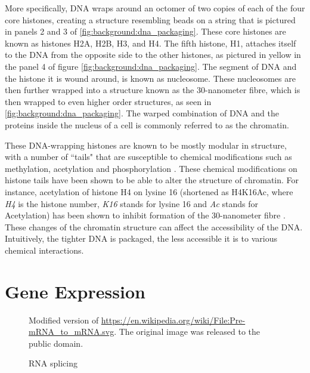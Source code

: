\documentclass[parskip]{cs4rep}
\newcommand{\histonemodification}[1]{#1}
\begin{document}
More specifically, DNA wraps around an octomer of two copies of each of the four core histones, creating a structure resembling beads on a string that is pictured in panels 2 and 3 of \autoref{fig:background:dna_packaging}. These core histones are known as histones H2A, H2B, H3, and H4.
The fifth histone, H1, attaches itself to the DNA from the opposite side to the other histones, as pictured in yellow in the panel 4 of figure \ref{fig:background:dna_packaging}. The segment of DNA and the histone it is wound around, is known as nucleosome. These nucleosomes are then further wrapped into a structure known as the 30-nanometer fibre, which is then  wrapped to even higher order structures, as seen in \autoref{fig:background:dna_packaging}. The warped combination of DNA and the proteins inside the nucleus of a cell is commonly referred to as the chromatin.

These DNA-wrapping histones are known to be mostly modular in structure, with a number of ``tails" that are susceptible to chemical modifications such as methylation, acetylation and phosphorylation \cite{Fischle:2003tl,Kouzarides:2007js}. These chemical modifications on histone tails have been shown to be able to alter the structure of chromatin. For instance, acetylation of histone H4 on lysine 16 (shortened as \histonemodification{H4K16Ac}, where \emph{H4} is the histone number, \emph{K16} stands for lysine 16 and \emph{Ac} stands for Acetylation) has been shown to inhibit formation of the 30-nanometer fibre \cite{ShogrenKnaak:2006gt}. These changes of the chromatin structure can affect the accessibility of the DNA. Intuitively, the tighter DNA is packaged, the less accessible it is to various chemical interactions.

\section{Gene Expression}
\begin{figure}[t]
\centering
{}
{\centering Modified version of \url{https://en.wikipedia.org/wiki/File:Pre-mRNA_to_mRNA.svg}. The original image was released to the public domain.}
\caption{RNA splicing}
\label{fig:background:splicing}
\end{figure}
\end{document}
